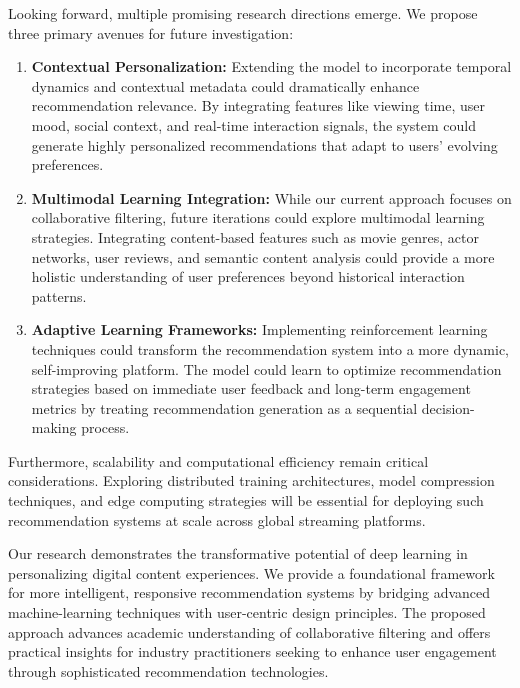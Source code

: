 \documentclass[sigconf]{acmart}
\begin{document}
Looking forward, multiple promising research directions emerge. We propose three primary avenues for future investigation:

\begin{enumerate}
    \item \textbf{Contextual Personalization:} Extending the model to incorporate temporal dynamics and contextual metadata could dramatically enhance recommendation relevance. By integrating features like viewing time, user mood, social context, and real-time interaction signals, the system could generate highly personalized recommendations that adapt to users' evolving preferences.
    
    \item \textbf{Multimodal Learning Integration:} While our current approach focuses on collaborative filtering, future iterations could explore multimodal learning strategies. Integrating content-based features such as movie genres, actor networks, user reviews, and semantic content analysis could provide a more holistic understanding of user preferences beyond historical interaction patterns.
    
    \item \textbf{Adaptive Learning Frameworks:} Implementing reinforcement learning techniques could transform the recommendation system into a more dynamic, self-improving platform. The model could learn to optimize recommendation strategies based on immediate user feedback and long-term engagement metrics by treating recommendation generation as a sequential decision-making process.
\end{enumerate}

Furthermore, scalability and computational efficiency remain critical considerations. Exploring distributed training architectures, model compression techniques, and edge computing strategies will be essential for deploying such recommendation systems at scale across global streaming platforms.

Our research demonstrates the transformative potential of deep learning in personalizing digital content experiences. We provide a foundational framework for more intelligent, responsive recommendation systems by bridging advanced machine-learning techniques with user-centric design principles. The proposed approach advances academic understanding of collaborative filtering and offers practical insights for industry practitioners seeking to enhance user engagement through sophisticated recommendation technologies.
\end{document}

